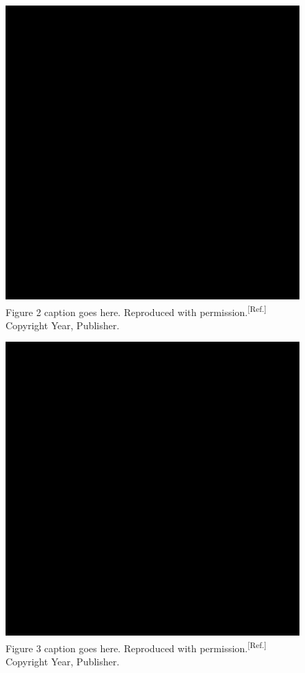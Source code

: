 \documentclass{WileyMSP-template}
\begin{document}
\begin{figure}
  \includegraphics[width=\linewidth]{placeholder-image.png}
  \caption{Figure 2 caption goes here. Reproduced with permission.\textsuperscript{[Ref.]} Copyright Year, Publisher.}
  \label{fig:boat1}
\end{figure}

\begin{figure}
  \includegraphics[width=\linewidth]{placeholder-image.png}
  \caption{Figure 3 caption goes here. Reproduced with permission.\textsuperscript{[Ref.]} Copyright Year, Publisher.}
  \label{fig:boat1}
\end{figure}
\end{document}
